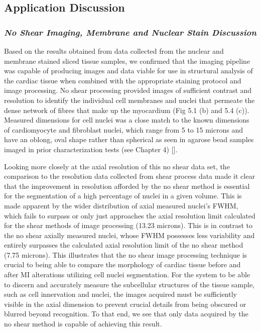 \subsection{Application Discussion}
\subsubsection{\textit{No Shear Imaging, Membrane and Nuclear Stain Discussion}}
Based on the results obtained from data collected from the nuclear and membrane stained sliced tissue samples, we confirmed that the imaging pipeline was capable of producing images and data viable for use in structural analysis of the cardiac tissue when combined with the appropriate staining protocol and image processing. No shear processing provided images of sufficient contrast and resolution to identify the individual cell membranes and nuclei that permeate the dense network of fibres that make up the myocardium (Fig 5.1 (b) and 5.4 (c)). Measured dimensions for cell nuclei was a close match to the known dimensions of cardiomyocyte and fibroblast nuclei, which range from 5 to 15 microns and have an oblong, oval shape rather than spherical as seen in agarose bead samples imaged in prior characterization tests (see Chapter 4) []. 

Looking more closely at the axial resolution of this no shear data set, the comparison to the resolution data collected from shear process data made it clear that the improvement in resolution afforded by the no shear method is essential for the segmentation of a high percentage of nuclei in a given volume. This is made apparent by the wider distribution of axial measured nuclei's FWHM, which fails to surpass or only just approaches the axial resolution limit calculated for the shear methods of image processing (13.23 microns). This is in contrast to the no shear axially measured nuclei, whose FWHM possesses less variability and entirely surpasses the calculated axial resolution limit of the no shear method (7.75 microns). This illustrates that the no shear image processing technique is crucial to being able to compare the morphology of cardiac tissue before and after MI alterations utilizing cell nuclei segmentation. For the system to be able to discern and accurately measure the subcellular structures of the tissue sample, such as cell innervation and nuclei, the images acquired must be sufficiently visible in the axial dimension to prevent crucial details from being obscured or blurred beyond recognition. To that end, we see that only data acquired by the no shear method is capable of achieving this result.

